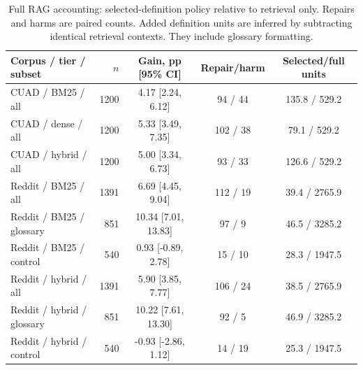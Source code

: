 \begin{table}[htbp]\centering\small
\caption{Full RAG accounting: selected-definition policy relative to retrieval only. Repairs and harms are paired counts. Added definition units are inferred by subtracting identical retrieval contexts. They include glossary formatting.}
\label{tab:supp-rag}
\begin{tabular}{@{}lrccc@{}}\toprule
Corpus / tier / subset & $n$ & Gain, pp [95\% CI] & Repair/harm & Selected/full units\\\midrule
CUAD / BM25 / all & 1200 & 4.17 [2.24, 6.12] & 94 / 44 & 135.8 / 529.2\\
CUAD / dense / all & 1200 & 5.33 [3.49, 7.35] & 102 / 38 & 79.1 / 529.2\\
CUAD / hybrid / all & 1200 & 5.00 [3.34, 6.73] & 93 / 33 & 126.6 / 529.2\\
Reddit / BM25 / all & 1391 & 6.69 [4.45, 9.04] & 112 / 19 & 39.4 / 2765.9\\
Reddit / BM25 / glossary & 851 & 10.34 [7.01, 13.83] & 97 / 9 & 46.5 / 3285.2\\
Reddit / BM25 / control & 540 & 0.93 [-0.89, 2.78] & 15 / 10 & 28.3 / 1947.5\\
Reddit / hybrid / all & 1391 & 5.90 [3.85, 7.77] & 106 / 24 & 38.5 / 2765.9\\
Reddit / hybrid / glossary & 851 & 10.22 [7.61, 13.30] & 92 / 5 & 46.9 / 3285.2\\
Reddit / hybrid / control & 540 & -0.93 [-2.86, 1.12] & 14 / 19 & 25.3 / 1947.5\\
\bottomrule\end{tabular}\end{table}